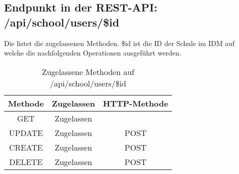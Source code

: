 \subsection{Endpunkt in der REST-API: /api/school/users/\$id}
Die  listet die zugelassenen Methoden. 
\$id ist die ID der Schule im IDM auf welche die nachfolgenden Operationen ausgeführt werden.

\begin{table}[!htbp]
	\begin{tabular}{|c|c|c|}
		\hline
			\textbf{Methode} & \textbf{Zugelassen} & \textbf{HTTP-Methode} \\ \hline
			GET & Zugelassen &  \\ \hline
			UPDATE & Zugelassen & POST \\ \hline 
			CREATE & Zugelassen & POST \\ \hline 
			DELETE & Zugelassen & POST \\ \hline
	\end{tabular}

		\caption{Zugelassene Methoden auf /api/school/users/\$id}
		\label{tab:end:rest:api:school:users:id:meth}
\end{table}






